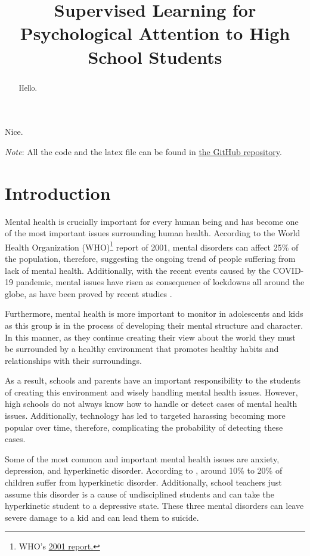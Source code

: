 \documentclass[conference]{IEEEtran}
\title{Supervised Learning for Psychological Attention to High School Students}
\author{\IEEEauthorblockN{Juan S. Cárdenas-Rodríguez}
  \IEEEauthorblockA{\textit{Department of Mathematical Sciences} \\
    \textit{EAFIT University}\\
    Medellín, Colombia \\
    jscardenar@eafit.edu.co} \and \IEEEauthorblockN{David Plazas}
  \IEEEauthorblockA{\textit{Department of Mathematical Sciences} \\
    \textit{EAFIT University}\\
    Medellín, Colombia \\
    dplazas@eafit.edu.co} }
\theoremstyle{definition}
\theoremstyle{remark}
\theoremstyle{remark}
\begin{document}
\maketitle

\begin{abstract}
  Hello.
\end{abstract}

\begin{IEEEkeywords}
  Nice.
\end{IEEEkeywords}

\textit{Note}: All the code and the latex file can be found in
\href{https://github.com/juanscr/ai-works}{the GitHub repository}.

\section{Introduction}

Mental health is crucially important for every human being and has become one of
the most important issues surrounding human health. According to the World
Health Organization (WHO)\footnote{WHO's \href{https://bit.ly/34l2v94}{2001
    report.}} report of 2001, mental disorders can affect 25\% of the
population, therefore, suggesting the ongoing trend of people suffering from
lack of mental health. Additionally, with the recent events caused by the
COVID-19 pandemic, mental issues have risen as consequence of lockdowns all
around the globe, as have been proved by recent studies
\parencite{rossi2020,xiong2020}.

Furthermore, mental health is more important to monitor in adolescents and kids
as this group is in the process of developing their mental structure and
character. In this manner, as they continue creating their view about the world
they must be surrounded by a healthy environment that promotes healthy habits
and relationships with their surroundings.

As a result, schools and parents have an important responsibility to the
students of creating this environment and wisely handling mental health issues.
However, high schools do not always know how to handle or detect cases of mental
health issues. Additionally, technology has led to targeted harassing becoming
more popular over time, therefore, complicating the probability of detecting
these cases.

Some of the most common and important mental health issues are anxiety,
depression, and hyperkinetic disorder. According to \textcite{schulte2016},
around 10\% to 20\% of children suffer from hyperkinetic disorder. Additionally,
school teachers just assume this disorder is a cause of undisciplined students
and can take the hyperkinetic student to a depressive state. These three mental
disorders can leave severe damage to a kid and can lead them to suicide.
\end{document}
